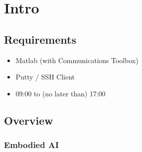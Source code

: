 \documentclass[
    fontsize      = 11pt,
    paper         = a4,
    twoside       = false,
    parskip       = half,
    pagesize      = false,
]{scrartcl}
\author{Robin Prillwitz}
\date{08. August 2022}
\providecommand{\tightlist}{%
  \setlength{\itemsep}{0pt}\setlength{\parskip}{0pt}}
\begin{document}
\hypertarget{intro}{%
\section{Intro}\label{intro}}

\hypertarget{requirements}{%
\subsection{Requirements}\label{requirements}}

\begin{itemize}
\tightlist
\item
  Matlab (with Communications Toolbox)
\item
  Putty / SSH Client
\item
  09:00 to (no later than) 17:00
\end{itemize}

\hypertarget{overview}{%
\subsection{Overview}\label{overview}}

\hypertarget{embodied-ai}{%
\subsubsection{Embodied AI}\label{embodied-ai}}
\end{document}
